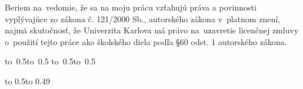 \medskip\noindent
Beriem na~vedomie, že sa na moju prácu vzťahujú práva a povinnosti vyplývajúce
zo zákona č. 121/2000 Sb., autorského zákona v~platnom znení, najmä skutočnosť,
že Univerzita Karlova má právo na~uzavretie licenčnej zmluvy o~použití tejto
práce ako školského diela podľa §60 odst. 1 autorského zákona.

\vspace{10mm}

\hbox{\hbox to 0.5\hbox to 0.5\hsize{\dotfill\quad}}
\smallskip
\hbox{\hbox to 0.5\hsize{}\hbox to 0.5}

\vspace{20mm}
\newpage


\openright

\noindent
\Podekovani

\newpage


\openright

\vbox to 0.5\nobreak\vbox to 0.49

\newpage

\openright
\pagestyle{plain}
\setcounter{page}{1}
